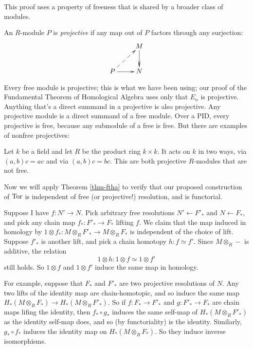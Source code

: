 This proof uses a property of freeness that is shared by a broader class of
modules. 

\begin{definition}
An $R$-module $P$ is {\em projective} if any map out of $P$ factors through 
any surjection:
\begin{equation*}
\xymatrix{ & M\ar@{->>}[d]\\
P\ar@{-->}[ur]\ar[r] & N}
\end{equation*}
\end{definition}
Every free module is projective; this is what we have been using;
our proof of the Fundamental Theorem of Homological Algebra uses only that 
$E_n$ is projective. 
Anything that's a direct summand in a projective is also projective. Any projective module is a direct summand of a free module. Over a PID, every projective is free, because any submodule of a free is free. But there are examples of
nonfree projectives: 
\begin{example}
Let $k$ be a field and let $R$ be the product ring $k\times k$. It acts on $k$
in two ways, via $(a,b)c=ac$ and via $(a,b)c=bc$. This are both projective $R$-modules that are not free.
\end{example}

Now we will apply Theorem \ref{thm-ftha}
to verify that our proposed construction of 
$\operatorname{Tor}$ is independent of free (or projective!) resolution, and is functorial. 

Suppose I have $f:N'\to N$. Pick arbitrary free resolutions 
$N'\leftarrow F'_*$ and $N\leftarrow F_*$, and pick any chain map 
$f_*:F'_*\to F_*$ lifting $f$. We claim that the map
induced in homology by $1\otimes f_*:M\otimes_RF'_*\to M\otimes_RF_*$
is independent of the choice of lift. Suppose $f'_*$ is another lift,
and pick a chain homotopy $h:f\simeq f'$. Since $M\otimes_R-$ is additive, 
the relation 
\[
1\otimes h:1\otimes f\simeq 1\otimes f'
\] 
still holds. So $1\otimes f$ and $1\otimes f'$ induce the same map in homology.

For example, suppose that $F_*$ and $F'_*$ are two projective resolutions of 
$N$. Any two lifts of the identity map are chain-homotopic, and so induce
the same map $H_*(M\otimes_RF_*)\to H_*(M\otimes_RF'_*)$. So if $f:F_*\to F'_*$
and $g:F'_*\to F_*$ are chain maps lifing the identity, then $f_*\circ g_*$
induces the same self-map of $H_*(M\otimes_RF'_*)$ as the identity self-map 
does, and so (by functoriality) is the identity. Similarly, $g_*\circ f_*$
induces the identity map on $H_*(M\otimes_RF_*)$. So they induce inverse
isomorphisms. 

